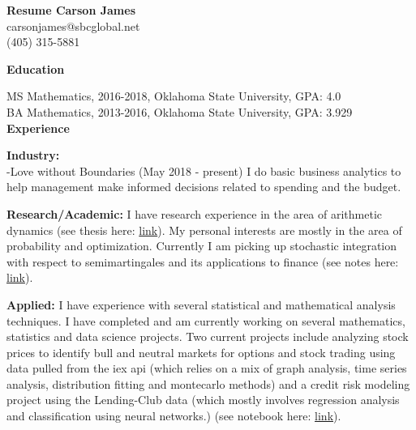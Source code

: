 \documentclass[12pt]{amsart}
\newcommand{\n}{\noindent}
\begin{document}
\textbf{\hspace{7cm}\large Resume \hspace{4cm} \large Carson James}\\ \phantom{1} \hspace{13cm} carsonjames@sbcglobal.net\\ \phantom{1} \hspace{13.9cm} (405) 315-5881


\n\textbf{\large Education} \vspace{2mm}

\n MS Mathematics, 2016-2018, Oklahoma State University, GPA: 4.0\\
\n BA Mathematics, 2013-2016, Oklahoma State University, GPA: 3.929 \vspace{.5mm}\\

 \n \textbf{\large Experience} \vspace{2mm}

\n \textbf{Industry:} \\
\n -Love without Boundaries (May 2018 - present) I do basic business analytics to help management make informed decisions related to spending and the budget. \vspace{2mm}

\n \textbf{Research/Academic:}
I have research experience in the area of arithmetic dynamics (see thesis here: \textcolor{blue}{ \href{https://github.com/carsonaj/Math/blob/master/Arithmetic\%20Dynamics/Arithmetic\%20Dynamics\%20Notes.pdf}{link}}). My personal interests are mostly in the area of probability and optimization. Currently I am picking up stochastic integration with respect to semimartingales and its applications to finance (see notes here: \textcolor{blue}{ \href{https://github.com/carsonaj/Math/blob/master/Stochastic\%20Analysis/Stochastic\%20Processes\%20-\%20James.pdf}{link}}). \vspace{2mm}


\n  \textbf{Applied:} I have experience with several statistical and mathematical analysis techniques. I have completed and am currently working on several mathematics, statistics and data science projects. Two current projects include analyzing stock prices to identify bull and neutral markets for options and stock trading using data pulled from the iex api (which relies on a mix of graph analysis, time series analysis, distribution fitting and montecarlo methods) and a credit risk modeling project using the Lending-Club data (which mostly involves regression analysis and classification using neural networks.) (see notebook here: \textcolor{blue}{\href{https://github.com/carsonaj/Lending-Club/blob/master/analysis.ipynb} {link}}).\vspace{2mm}
\end{document}

